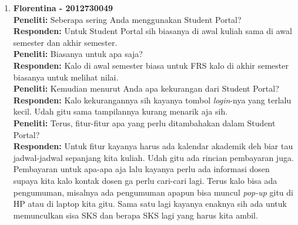 \begin{enumerate}
	\item\textbf{Florentina - 2012730049}\\
	\textbf{Peneliti:} Seberapa sering Anda menggunakan Student Portal?\\
	\textbf{Responden:} Untuk Student Portal sih biasanya di awal kuliah sama di awal semester dan akhir semester.\\
	\textbf{Peneliti:} Biasanya untuk apa saja?\\
	\textbf{Responden:} Kalo di awal semester biasa untuk FRS kalo di akhir semester biasanya untuk melihat nilai.\\
	\textbf{Peneliti:} Kemudian menurut Anda apa kekurangan dari Student Portal?\\
	\textbf{Responden:} Kalo kekurangannya sih kayanya tombol \textit{login}-nya yang terlalu kecil. Udah gitu sama tampilannya kurang menarik aja sih.\\
	\textbf{Peneliti:} Terus, fitur-fitur apa yang perlu ditambahakan dalam Student Portal?\\
	\textbf{Responden:} Untuk fitur kayanya harus ada kalendar akademik deh biar tau jadwal-jadwal sepanjang kita kuliah. Udah gitu ada rincian pembayaran juga. Pembayaran untuk apa-apa aja lalu kayanya perlu ada informasi dosen supaya kita kalo kontak dosen ga perlu cari-cari lagi. Terus kalo bisa ada pengumuman, misalnya ada pengumuman apapun bisa muncul \textit{pop-up} gitu di HP atau di laptop kita gitu. Sama satu lagi kayanya enaknya sih ada untuk memunculkan sisa SKS dan berapa SKS lagi yang harus kita ambil.\\
	

\end{enumerate}
